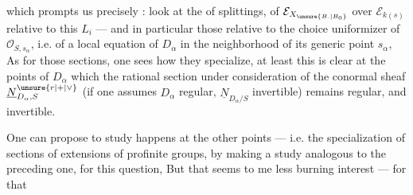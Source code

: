 which prompts us precisely : look at the  of splittings, of $\mathcal E_{X_{\unsure{B.|B_0}}}$ over $\mathcal E_{k(s)}$ relative to this $L_i$ --- and in particular those relative to the choice  uniformizer of $\mathcal O_{S,s_\alpha}$, i.e. of a local equation of $D_\alpha$ in the neighborhood of its generic point $s_\alpha$,   As for those sections, one sees how they specialize, at least this is clear at the points of $D_\alpha$  which the rational section under consideration of the conormal sheaf $\underline N_{D_\alpha,S}^{\unsure{r|+|\vee}}$ (if one assumes $D_\alpha$ regular, \unsure{\deleted{)}|)|\&}   $\underline N_{D_\alpha/S}$ invertible) remains regular, and invertible.

One can propose to study   happens at the other points --- i.e. the specialization of sections  of extensions of profinite groups, by making a study analogous to the preceding one, for this question, But that seems to me   less burning interest --- for that 
